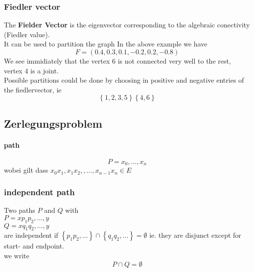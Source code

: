\documentclass[a4paper]{article}
\theoremstyle{definition}
\theoremstyle{remark}
\begin{document}
\subsubsection{Fiedler vector}
\label{ssub:fiedler_vector}

The \textbf{Fielder Vector} is the eigenvector corresponding to the algebraic conectivity (Fiedler value).\\
It can be used to partition the graph
In the above example we have
\begin{equation*}
	 F=(0.4,0.3,0.1,-0.2,0.2,-0.8)
\end{equation*}
We see immidiately that the vertex 6 is not connected very well to the rest, vertex 4 is a joint.\\
Possible partitions could be done by choosing in positive and negative entries of the fiedlervector, ie
\begin{equation*}
	\left\{ 1,2,3,5 \right\}\left\{ 4,6 \right\}
\end{equation*}


\subsection{Zerlegungsproblem}
\label{sub:zerlegungsproblem}

\paragraph{path}
\label{par:path}

\begin{equation}
  P=x_0,\dots,x_n
\end{equation}
wobei gilt dass $x_0x_1,x_1x_2,,\dots,x_{n-1}x_n\in E$
\subsubsection{independent path}
\label{ssub:independent_path}
Two paths $P$ and $Q$ with \\
$P=xp_1p_2,\dots,y$\\
$Q=xq_1q_2,\dots,y$\\
are independent if $ \left\{ p_1p_2,\dots \right\}\cap\left\{ q_1q_2,\dots \right\}= \emptyset$ ie. they are disjunct except for start- and endpoint.\\
 we write 
 \begin{equation*}
P\cap Q= \emptyset
 \end{equation*}
\end{document}

